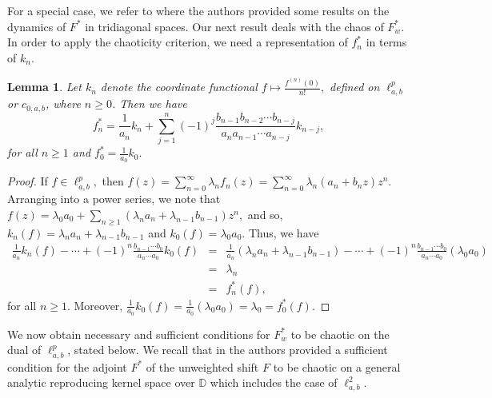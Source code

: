 \documentclass[12pt, reqno]{amsart}
\newtheorem{lemma}[theorem]{Lemma}
\theoremstyle{definition}
\theoremstyle{remark}
\numberwithin{equation}{section}
\begin{document}
 For a special case, we refer to \cite{Mundayadan-Sarkar} where the authors provided some results on the dynamics of $F^*$ in tridiagonal spaces. Our next result deals with the chaos of $F_w^*$. In order to apply the chaoticity criterion, we need a representation of $f_n^*$ in terms of $k_n$. 

\begin{lemma}\label{rep-unilateral}
     Let $k_n$ denote the coordinate functional $f\mapsto \frac{f^{(n)}(0)}{n!},$ defined on $\ell^p_{a,b}$ or $c_{0,a,b}$, where $n\geq 0$. Then we have
      \[
        f_{n}^{*}= \frac{1}{a_{n}}k_{n}+\sum_{j=1}^{n}(-1)^{j}\frac{b_{n-1}b_{n-2}\cdots b_{n-j}}{a_{n}a_{n-1}\cdots a_{n-j}}k_{n-j},
       \]
       for all $n\geq1$ and $f_{0}^{*}=\frac{1}{a_{0}}k_{0}.$
\end{lemma}

\begin{proof}
   If $f \in \ell^{p}_{a,b},$ then $f(z)=\sum_{n=0}^{\infty} \lambda_{n}f_{n}(z)=\sum_{n=0}^{\infty}\lambda_{n}(a_{n}+b_{n}z)z^{n}.$ Arranging into a power series, we note that $f(z)=\lambda_0a_0+\sum_{n\geq 1} (\lambda_na_n+\lambda_{n-1}b_{n-1})z^n,$ 
 and so, $k_n(f)=\lambda_na_n+\lambda_{n-1}b_{n-1}$ and $k_{0}(f)=\lambda_{0}a_{0}.$ Thus, we have
 \begin{eqnarray*}
     \frac{1}{a_{n}}k_{n}(f)-\cdots +(-1)^{n}\frac{b_{n-1}\cdots b_{0}}{a_{n}\cdots a_{0}}k_{0}(f)&=&\frac{1}{a_{n}}(\lambda_na_n+\lambda_{n-1}b_{n-1})-\cdots+(-1)^{n}\frac{b_{n-1}\cdots b_{0}}{a_{n}\cdots a_{0}}(\lambda_{0}a_{0})\\
    &=& \lambda_{n}\\
     &=&  f_{n}^{*}(f),
 \end{eqnarray*}
 for all $n\geq 1$. Moreover, $\frac{1}{a_{0}}k_{0}(f)=\frac{1}{a_{0}}(\lambda_{0}a_{0})=\lambda_{0}=f_{0}^{*}(f).$
 \end{proof}


We now obtain necessary and sufficient conditions for $F_w^*$ to be chaotic on the dual of $\ell^p_{a,b}$, stated below. We recall that in \cite{Mundayadan-Sarkar} the authors provided a sufficient condition for the adjoint $F^*$ of the unweighted shift $F$ to be chaotic on a general analytic reproducing kernel space over $\mathbb{D}$ which includes the case of $\ell^2_{a,b}$. 
\end{document}
